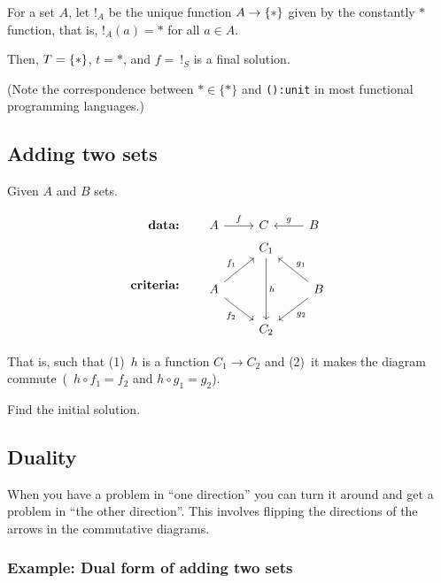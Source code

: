 For a set $A$, let $!_A$ be the unique function $A\to \{ \ast \}$ given by
the constantly $\ast$ function, that is, $!_A(a) = \ast$ for all $a\in A$.

Then, $T=\{ \ast \}$, $t=\ast$, and $f=\ !_S$ is a final solution.

(Note the correspondence between $\ast \in \{ \ast \}$ and \texttt{():unit}
in most functional programming languages.)

\subsection{Adding two sets}

Given $A$ and $B$ sets.

\begin{align*}
    \textbf{data:} \qquad& \begin{tikzcd}[ampersand replacement=\&]
            A \arrow[r, "f"] \& C \& B \arrow[l, swap, "g"]
        \end{tikzcd}\\
    \textbf{criteria:} \qquad& \begin{tikzcd}[ampersand replacement=\&]
        {} \& C_1 \arrow[dd, "h"] \& {} \\
        A \arrow[ru, "f_1"] \arrow[rd, swap, "f_2"]
        \& {}
        \&
        B \arrow[lu, swap, "g_1"] \arrow[ld, "g_2"]
        \\
        {} \& C_2 \& {}
    \end{tikzcd}
\end{align*}

That is, such that (1)~$h$ is a function $C_1 \rightarrow C_2$ and (2)~it
makes the diagram commute~(\ie~$h \circ f_1 = f_2$ and $h \circ g_1 = g_2$).

\begin{exercise}
    Find the initial solution. \label{ex:addsets}
\end{exercise}

\subsection{Duality}

When you have a problem in ``one direction'' you can turn it around and get a
problem in ``the other direction''. This involves flipping the directions of
the arrows in the commutative diagrams.

\subsubsection*{Example: Dual form of adding two sets}

